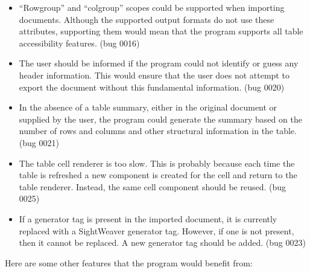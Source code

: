 \begin{itemize}

\item ``Rowgroup'' and ``colgroup'' scopes could be supported when
importing documents. Although the supported output formats do
not use these attributes, supporting them would mean that the
program supports all table accessibility features. (bug 0016)

\item The user should be informed if the program could not
identify or guess any header information. This would ensure
that the user does not attempt to export the document without
this fundamental information. (bug 0020)

\item In the absence of a table summary, either in the original
document or supplied by the user, the program could generate
the summary based on the number of rows and columns and other
structural information in the table. (bug 0021)

\item The table cell renderer is too slow. This is probably
because each time the table is refreshed a new component
is created for the cell and return to the table renderer.
Instead, the same cell component should be reused. (bug 0025)

\item If a generator tag is present in the imported document,
it is currently replaced with a SightWeaver generator tag.
However, if one is not present, then it cannot be replaced. A
new generator tag should be added. (bug 0023)

\end{itemize}

Here are some other features that the program would benefit from:

